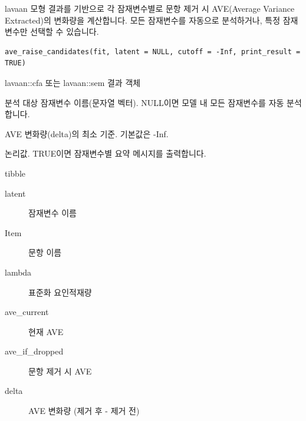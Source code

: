 \documentclass[a4paper]{book}
\begin{document}
%
\begin{Description}
lavaan 모형 결과를 기반으로 각 잠재변수별로 문항 제거 시
AVE(Average Variance Extracted)의 변화량을 계산합니다.
모든 잠재변수를 자동으로 분석하거나, 특정 잠재변수만 선택할 수 있습니다.
\end{Description}
%
\begin{Usage}
\begin{verbatim}
ave_raise_candidates(fit, latent = NULL, cutoff = -Inf, print_result = TRUE)
\end{verbatim}
\end{Usage}
%
\begin{Arguments}
\begin{ldescription}
\item[\code{fit}] lavaan::cfa 또는 lavaan::sem 결과 객체

\item[\code{latent}] 분석 대상 잠재변수 이름(문자열 벡터).
NULL이면 모델 내 모든 잠재변수를 자동 분석합니다.

\item[\code{cutoff}] AVE 변화량(delta)의 최소 기준. 기본값은 -Inf.

\item[\code{print\_result}] 논리값. TRUE이면 잠재변수별 요약 메시지를 출력합니다.
\end{ldescription}
\end{Arguments}
%
\begin{Value}
tibble
\begin{description}

\item[latent] 잠재변수 이름
\item[Item] 문항 이름
\item[lambda] 표준화 요인적재량
\item[ave\_current] 현재 AVE
\item[ave\_if\_dropped] 문항 제거 시 AVE
\item[delta] AVE 변화량 (제거 후 - 제거 전)

\end{description}

\end{Value}
%
\end{document}
